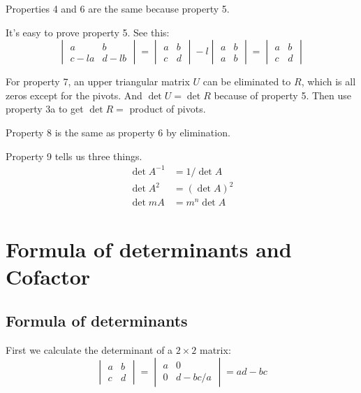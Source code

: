 \documentclass[10pt,a4paper,oneside,numbers=noenddot]{scrbook}
\theoremstyle{ctplain}
\theoremstyle{ctresult}
\begin{document}
Properties 4 and 6 are the same because property 5.

It's easy to prove property 5. See this:
\[
  \begin{vmatrix}
    a & b \\
    c-la & d-lb
  \end{vmatrix} =
  \begin{vmatrix}
    a & b \\
    c & d
  \end{vmatrix} -
  l \begin{vmatrix}
    a & b \\
    a & b
  \end{vmatrix} =
  \begin{vmatrix}
    a & b \\
    c & d
  \end{vmatrix}
\]

For property 7, an upper triangular matrix $U$ can be eliminated to $R$, which is all
zeros except for the pivots. And $\det U = \det R$ because of property 5. Then use
property 3a to get $\det R = $ product of pivots.

Property 8 is the same as property 6 by elimination.

Property 9 tells us three things.
\begin{align*}
  \det A^{-1} &= 1/\det A \\
  \det A^2 &= (\det A)^2 \\
  \det mA &= m^n \det A
\end{align*}

\section{Formula of determinants and Cofactor}
\subsection{Formula of determinants}

First we calculate the determinant of a $2 \times 2$ matrix:
\[
  \begin{vmatrix}
    a & b \\
    c & d
  \end{vmatrix} =
  \begin{vmatrix}
    a & 0 \\
    0 & d-bc/a
  \end{vmatrix} =
  ad - bc
\]
\end{document}

